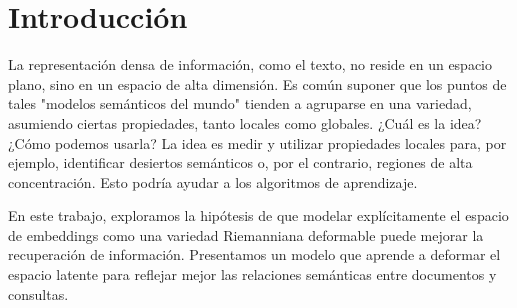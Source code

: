 \section{Introducción}
La representación densa de información, como el texto, no reside en un espacio plano, sino en un espacio de alta dimensión. Es común suponer que los puntos de tales "modelos semánticos del mundo" tienden a agruparse en una variedad, asumiendo ciertas propiedades, tanto locales como globales. ¿Cuál es la idea? ¿Cómo podemos usarla? La idea es medir y utilizar propiedades locales para, por ejemplo, identificar desiertos semánticos o, por el contrario, regiones de alta concentración. Esto podría ayudar a los algoritmos de aprendizaje.

En este trabajo, exploramos la hipótesis de que modelar explícitamente el espacio de embeddings como una variedad Riemanniana deformable puede mejorar la recuperación de información. Presentamos un modelo que aprende a deformar el espacio latente para reflejar mejor las relaciones semánticas entre documentos y consultas.
